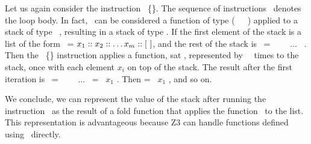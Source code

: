 \documentclass[a4paper,USenglish,cleveref, autoref,anonymous]{lipics-v2021}
\begin{document}
Let us again consider the instruction \ITER\
\{\INSTRUCTION\}. The sequence of instructions \INSTRUCTION\ denotes
the loop body. In fact, \INSTRUCTION\ can be considered a function of
type (\TY\ \STACKCONCAT \TYA\ \SRightarrow\ \TYA) applied to a stack
of type \TY\ \STACKCONCAT \TYA,
resulting in a stack of type \TYA. If the first element of
the stack is a list of the form \LIST\ = $x_1 :: x_2 ::
\dots x_m ::  [\ ]$, and the rest of the stack is \STACKZERO\ =
\StackOne\  \STACKCONCAT\ \StackTwo\ \STACKCONCAT\ ... \STACKCONCAT\
\StackN. Then the \ITER\ \{\INSTRUCTION\} instruction applies a 
function, sat \F, represented by \INSTRUCTION\ \M\ times to the stack, once
with each element $x_i$ on top of the stack. The result after 
the first iteration is \STACKONE\ = \StackOneOne\  \STACKCONCAT\
\StackTwoOne\ \STACKCONCAT\ ... \STACKCONCAT\ \StackNOne = \F\ $x_1$
\STACK. Then \STACKTWO = \F\ $x_1$ \STACKONE, and so on.


We conclude, we can represent the value of the stack after running the
instruction \ITER\  as the result of a fold function that applies the
function \F\ to the list. This representation is advantageous because
Z3 can handle functions defined using \FOLD\ directly.
\end{document}
